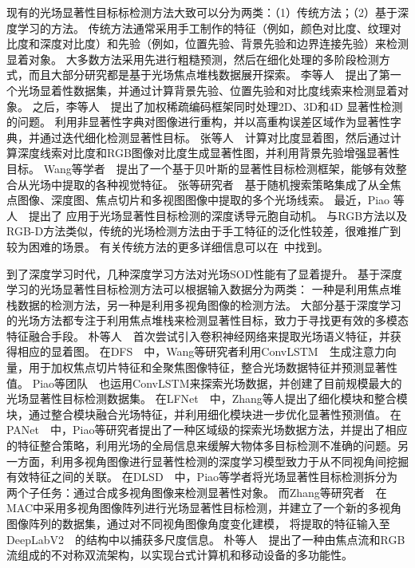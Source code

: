 现有的光场显著性目标标检测方法大致可以分为两类：（1）传统方法；（2）基于深度学习的方法。 传统方法通常采用手工制作的特征（例如，颜色对比度、纹理对比度和深度对比度）和先验（例如，位置先验、背景先验和边界连接先验）来检测显着对象。 
大多数方法采用先进行粗糙预测，然后在细化处理的多阶段检测方式，而且大部分研究都是基于光场焦点堆栈数据展开探索。
%
%
李等人~\cite{li2014saliency}~提出了第一个光场显着性数据集，并通过计算背景先验、位置先验和对比度线索来检测显着对象。
之后，李等人~\cite{li2015weighted}~提出了加权稀疏编码框架同时处理2D、3D和4D 显著性检测的问题。
利用非显著性字典对图像进行重构，并以高重构误差区域作为显著性字典，并通过迭代细化检测显著性目标。
张等人~\cite{zhang2015saliency}~计算对比度显着图，然后通过计算深度线索对比度和RGB图像对比度生成显著性图，并利用背景先验增强显著性目标。
Wang等学者~\cite{wang2017two}~提出了一个基于贝叶斯的显著性目标检测框架，能够有效整合从光场中提取的各种视觉特征。
张等研究者~\cite{zhang2017saliency}~基于随机搜索策略集成了从全焦点图像、深度图、焦点切片和多视图图像中提取的多个光场线索。 
最近，Piao 等人~\cite{piao2019saliency}~提出了
应用于光场显著性目标检测的深度诱导元胞自动机。
与RGB方法以及RGB-D方法类似，传统的光场检测方法由于手工特征的泛化性较差，很难推广到较为困难的场景。
有关传统方法的更多详细信息可以在\cite{fu2022light}~中找到。



到了深度学习时代，几种深度学习方法对光场SOD性能有了显着提升。 
基于深度学习的光场显著性目标检测方法可以根据输入数据分为两类：
一种是利用焦点堆栈数据的检测方法，另一种是利用多视角图像的检测方法。
大部分基于深度学习的光场方法都专注于利用焦点堆栈来检测显著性目标，致力于寻找更有效的多模态特征融合手段。
朴等人~\cite{piao2019deep}~首次尝试引入卷积神经网络来提取光场语义特征，并获得相应的显着图。 
在DFS~\cite{wang2019deep}~中，Wang等研究者利用ConvLSTM~\cite{chen2015convolutional}~生成注意力向量，用于加权焦点切片特征和全聚焦图像特征，整合光场数据特征并预测显著性值。
Piao等团队~\cite{zhang2019memory}~也运用ConvLSTM来探索光场数据，并创建了目前规模最大的光场显著性目标检测数据集。
在LFNet~\cite{zhang2020lfnet}~中，Zhang等人提出了细化模块和整合模块，通过整合模块融合光场特征，并利用细化模块进一步优化显著性预测值。
在PANet~\cite{piao2021panet}~中，Piao等研究者提出了一种区域级的探索光场数据方法，并提出了相应的特征整合策略，利用光场的全局信息来缓解大物体多目标检测不准确的问题。另一方面，利用多视角图像进行显著性检测的深度学习模型致力于从不同视角间挖掘有效特征之间的关联。
在DLSD~\cite{piao2019deep}~中，Piao等学者将光场显著性目标检测拆分为两个子任务：通过合成多视角图像来检测显著性对象。
而Zhang等研究者~\cite{zhang2020light}~在MAC中采用多视角图像阵列进行光场显著性目标检测，并建立了一个新的多视角图像阵列的数据集，通过对不同视角图像角度变化建模，
将提取的特征输入至DeepLabV2~\cite{chen2017deeplab}~的结构中以捕获多尺度信息。
朴等人~\cite{piao2020exploit}~提出了一种由焦点流和RGB流组成的不对称双流架构，以实现台式计算机和移动设备的多功能性。



